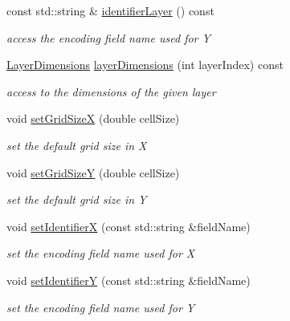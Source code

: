 \begin{DoxyCompactItemize}
const std\+::string \& \hyperlink{class_d_d4hep_1_1_d_d_segmentation_1_1_tiled_layer_segmentation_a3255d9d66a2d205dab49072c079dfaf1}{identifier\+Layer} () const
\begin{DoxyCompactList}\small\item\em access the encoding field name used for Y \end{DoxyCompactList}\item 
\hyperlink{struct_d_d4hep_1_1_d_d_segmentation_1_1_tiled_layer_segmentation_1_1_layer_dimensions}{Layer\+Dimensions} \hyperlink{class_d_d4hep_1_1_d_d_segmentation_1_1_tiled_layer_segmentation_a815d2b95bc2d5a3efceb9f4ad96df7ad}{layer\+Dimensions} (int layer\+Index) const
\begin{DoxyCompactList}\small\item\em access to the dimensions of the given layer \end{DoxyCompactList}\item 
void \hyperlink{class_d_d4hep_1_1_d_d_segmentation_1_1_tiled_layer_segmentation_aeb24630c5ce6f0510d516affa3fd798f}{set\+Grid\+SizeX} (double cell\+Size)
\begin{DoxyCompactList}\small\item\em set the default grid size in X \end{DoxyCompactList}\item 
void \hyperlink{class_d_d4hep_1_1_d_d_segmentation_1_1_tiled_layer_segmentation_a1d3f9e083551c3a67500d7da77d33684}{set\+Grid\+SizeY} (double cell\+Size)
\begin{DoxyCompactList}\small\item\em set the default grid size in Y \end{DoxyCompactList}\item 
void \hyperlink{class_d_d4hep_1_1_d_d_segmentation_1_1_tiled_layer_segmentation_adab12f13ca0d94e18e8d2ef82c8115cb}{set\+IdentifierX} (const std\+::string \&field\+Name)
\begin{DoxyCompactList}\small\item\em set the encoding field name used for X \end{DoxyCompactList}\item 
void \hyperlink{class_d_d4hep_1_1_d_d_segmentation_1_1_tiled_layer_segmentation_ab9a0cd946f996399d9cabfecc4223abd}{set\+IdentifierY} (const std\+::string \&field\+Name)
\begin{DoxyCompactList}\small\item\em set the encoding field name used for Y \end{DoxyCompactList}\item 

\end{DoxyCompactItemize}
